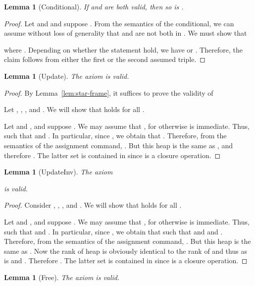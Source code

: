 \documentclass{LMCS}
\newtheorem{lemma}[theorem]{Lemma}
\theoremstyle{remark}
\newcommand{\ALMOSTPURE}{\text{pseudo pure}\xspace}
\begin{document}
\begin{figure*}[t]
\begin{lemma}[Conditional]
If  
and  are both valid, 
then so is . 
\end{lemma}

\begin{proof}
Let  and  and suppose . From the semantics of 
the conditional, we can assume without loss of generality that  and  
are not both in . We must show that 

where .
Depending on whether the statement  hold, we have  or . Therefore, the claim follows from either the first or the second assumed triple. 
\end{proof}

\begin{lemma}[Update]
The axiom  is valid. 
\end{lemma}

\begin{proof}
By Lemma~\ref{lem:star-frame}, it suffices to prove the validity of

Let , , ,  and . 
We will show that  holds for all . 

Let  and , and suppose . 
We may assume that , for otherwise  is immediate. 
Thus,  such that  and . 
In particular, since , we obtain that . 
Therefore, from the semantics of the assignment command,  
. 
But this heap is the same as , 
and therefore . The latter set is contained in  since  is a closure operation.
\end{proof}



\begin{lemma}[UpdateInv]
The axiom
 
 is valid. 
\end{lemma}

\begin{proof} 
Consider  , , ,  and .  We
will show that  holds for all .

Let  and , and suppose . 
We may assume that , for otherwise  is immediate. 
Thus,  such that  and . 
In particular, since , we obtain that
 such that 
  and 
  and
 .
Therefore, from the semantics of the assignment command,  
. 
But this heap is the same as .
Now the rank of heap  is obviously identical to the rank of
 and thus  as  is \ALMOSTPURE and .
Therefore . The latter set is contained in  since  is a closure operation.
\end{proof}





\begin{lemma}[Free] 
The axiom  is valid. 
\end{lemma}


\end{figure*}
\end{document}
